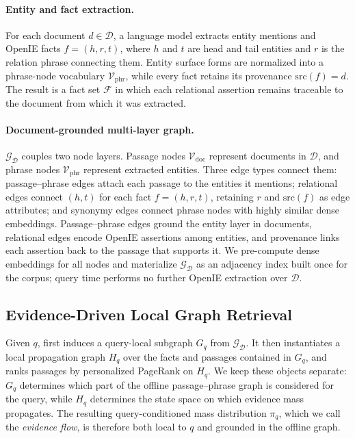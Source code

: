 \paragraph{Entity and fact extraction.}
For each document $d \in \mathcal{D}$, a language model extracts entity
mentions and OpenIE facts $f=(h,r,t)$, where $h$ and $t$ are head and tail
entities and $r$ is the relation phrase connecting them. Entity surface
forms are normalized into a phrase-node vocabulary
$\mathcal{V}_{\mathrm{phr}}$, while every fact retains its provenance
$\mathrm{src}(f)=d$. The result is a fact set $\mathcal{F}$ in which each
relational assertion remains traceable to the document from which it was
extracted.

\paragraph{Document-grounded multi-layer graph.}
$\mathcal{G}_{\mathcal{D}}$ couples two node layers. Passage nodes
$\mathcal{V}_{\mathrm{doc}}$ represent documents in $\mathcal{D}$, and
phrase nodes $\mathcal{V}_{\mathrm{phr}}$ represent extracted entities.
Three edge types connect them: passage--phrase edges attach each passage
to the entities it mentions; relational edges connect $(h,t)$ for each
fact $f=(h,r,t)$, retaining $r$ and $\mathrm{src}(f)$ as edge attributes;
and synonymy edges connect phrase nodes with highly similar dense
embeddings. Passage--phrase edges ground the entity layer in documents,
relational edges encode OpenIE assertions among entities, and provenance
links each assertion back to the passage that supports it. We pre-compute
dense embeddings for all nodes and materialize
$\mathcal{G}_{\mathcal{D}}$ as an adjacency index built once for the
corpus; query time performs no further OpenIE extraction over
$\mathcal{D}$.

\subsection{Evidence-Driven Local Graph Retrieval}
\label{sec:method:retrieval}

Given $q$, \methodname{} first induces a query-local subgraph $G_q$ from
$\mathcal{G}_{\mathcal{D}}$. It then instantiates a local propagation
graph $H_q$ over the facts and passages contained in $G_q$, and ranks
passages by personalized PageRank on $H_q$. We keep these objects
separate: $G_q$ determines which part of the offline passage--phrase
graph is considered for the query, while $H_q$ determines the state space
on which evidence mass propagates. The resulting query-conditioned mass
distribution $\pi_q$, which we call the \emph{evidence flow}, is
therefore both local to $q$ and grounded in the offline graph.

